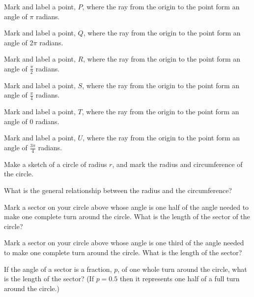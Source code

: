 \begin{problem}
  \begin{subproblem}
  \item Mark and label a point, $P$, where the ray from the origin to
    the point form an angle of $\pi$ radians.
  \item Mark and label a point, $Q$, where the ray from the origin to
    the point form an angle of $2\pi$ radians.
  \item Mark and label a point, $R$, where the ray from the origin to
    the point form an angle of $\frac{\pi}{2}$ radians.
  \item Mark and label a point, $S$, where the ray from the origin to
    the point form an angle of $\frac{\pi}{4}$ radians.
  \item Mark and label a point, $T$, where the ray from the origin to
    the point form an angle of $0$ radians.
  \item Mark and label a point, $U$, where the ray from the origin to
    the point form an angle of $\frac{3\pi}{4}$ radians.
  \end{subproblem}

  \clearpage

\item Make a sketch of a circle of radius $r$, and mark the radius and
  circumference of the circle.
  \vfill

  \begin{subproblem}
  \item What is the general relationship between the radius and the
    circumference?
    \vspace{4em}

  \item Mark a sector on your circle above whose angle is one half of
    the angle needed to make one complete turn around the circle. What
    is the length of the sector of the circle?  


    \vspace{4em}

  \item Mark a sector on your circle above whose angle is one third of
    the angle needed to make one complete turn around the circle. What
    is the length of the sector?  


    \vspace{4em}

  \item If the angle of a sector is a fraction, $p$, of one whole turn around
    the circle, what is the length of the sector? (If $p=0.5$ then it represents
    one half of a full turn around the circle.)
    \vspace{4em}


\end{subproblem}
\end{problem}
